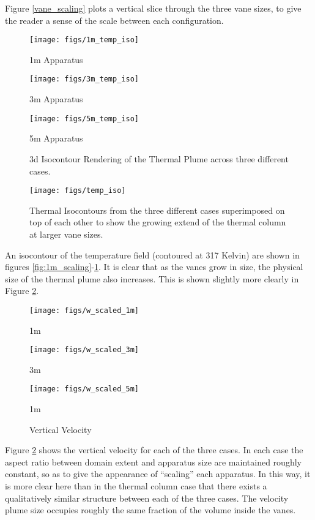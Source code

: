 \documentclass[english]{article}
\begin{document}
%
%
Figure \ref{vane_scaling} plots a vertical slice through the three vane sizes, to give the reader a sense of the 
scale between each configuration.

\begin{figure}[!htb]
  \texttt{[image: figs/1m\_temp\_iso]}
  \caption*{1m Apparatus}\label{fig:1m_scaling}
\endminipage\hfill
{}
  \texttt{[image: figs/3m\_temp\_iso]}
  \caption*{3m Apparatus}\label{fig:3m_scaling}
\endminipage\hfill
{}%
  \texttt{[image: figs/5m\_temp\_iso]}
  \caption*{5m Apparatus}\label{fig:5m_scaling}
\endminipage
\caption{3d Isocontour Rendering of the Thermal Plume across three different cases.}
\end{figure}


\begin{figure}[!htb]
  \begin{center}
    \texttt{[image: figs/temp\_iso]}
    \caption{Thermal Isocontours from the three different cases superimposed 
      on top of each other to show the growing extend of the thermal column at larger vane sizes. }
    \label{fig:scaling_slice}
  \end{center}
\end{figure}


An isocontour of the temperature field (contoured at 317 Kelvin) are shown in figures \ref{fig:1m_scaling}-\ref{fig:5m_scaling}. 
It is clear that as the vanes grow in size, the physical size of the thermal plume also increases. This is shown slightly more clearly in
 Figure \ref{fig:scaling_slice}. 

%
%


\begin{figure}[!htb]
\texttt{[image: figs/w\_scaled\_1m]}
\caption*{1m}\label{fig:1m_vz}
\endminipage\hfill
{}
\texttt{[image: figs/w\_scaled\_3m]}
\caption*{3m}\label{fig:3m_vz}
\endminipage\hfill
{}%
\texttt{[image: figs/w\_scaled\_5m]}
  \caption*{1m}\label{fig:5m_vz}
\endminipage
\caption{Vertical Velocity}
\end{figure}
 
Figure \ref{fig:scaling_slice} shows the vertical velocity for each of the three cases. In each case the aspect ratio between domain extent
and apparatus size are maintained roughly constant, so as to give the appearance of ``scaling'' each apparatus. In this way, it is more 
clear here than in the thermal column case that there exists a qualitatively similar structure between each of the three cases. The velocity plume 
size occupies roughly the same fraction of the volume inside the vanes. 


%
%

\end{document}
